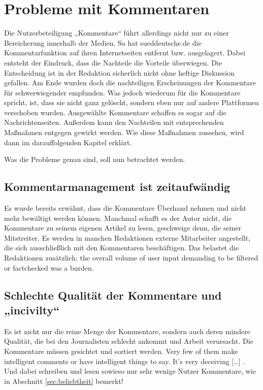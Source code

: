 \chapter{Probleme mit Kommentaren} \label{kap:probleme}

Die Nutzerbeteiligung „Kommentare“ führt allerdings nicht nur zu einer
Bereicherung innerhalb der Medien. So hat sueddeutsche.de die Kommentarfunktion
auf ihren Internetseiten entfernt bzw. ausgelagert. Dabei entsteht der Eindruck,
dass die Nachteile die Vorteile überwiegen. Die Entscheidung ist in der
Redaktion sicherlich nicht ohne heftige Diskussion gefallen. Am Ende wurden doch
die nachteiligen Erscheinungen der Kommentare für schwerwiegender empfunden. Was
jedoch wiederum für die Kommentare spricht, ist, dass sie nicht ganz gelöscht,
sondern eben nur auf andere Plattformen verschoben wurden. Ausgewählte
Kommentare schaffen es sogar auf die Nachrichtenseiten. Außerdem kann den
Nachteilen mit entsprechenden Maßnahmen entgegen gewirkt werden. Wie diese
Maßnahmen aussehen, wird dann im darauffolgenden Kapitel erklärt.

Was die Probleme genau sind, soll nun betrachtet werden.

\section{Kommentarmanagement ist zeitaufwändig}

Es wurde bereits erwähnt, dass die Kommentare Überhand nehmen und nicht mehr
bewältigt werden können. Manchmal schafft es der Autor nicht, die Kommentare zu
seinem eigenen Artikel zu lesen, geschweige denn, die seiner Mitstreiter. Es
werden in manchen Redaktionen externe Mitarbeiter angestellt, die sich
ausschließlich mit den Kommentaren beschäftigen. Das belastet die Redaktionen
zusätzlich: \glqq[\ldots] the overall volume of user input demanding to be filtered
or factchecked was a burden.\grqq{} \autocite[S.~172]{quandt}


\section{Schlechte Qualität der Kommentare und „incivilty“} \label{sec:schlecht}

Es ist nicht nur die reine Menge der Kommentare, sondern auch deren mindere
Qualität, die bei den Journalisten schlecht ankommt und Arbeit verursacht. Die
Kommentare müssen gesichtet und sortiert werden. \glqq Very few of them make
intelligent comments or have intelligent things to say. It's very deceiving
[\ldots]\grqq\- \autocite[S.~ 103]{reich}. Und dabei schreiben und lesen sowieso nur
sehr wenige Nutzer Kommentare, wie in Abschnitt \ref{sec:beliebtheit}
bemerkt!

